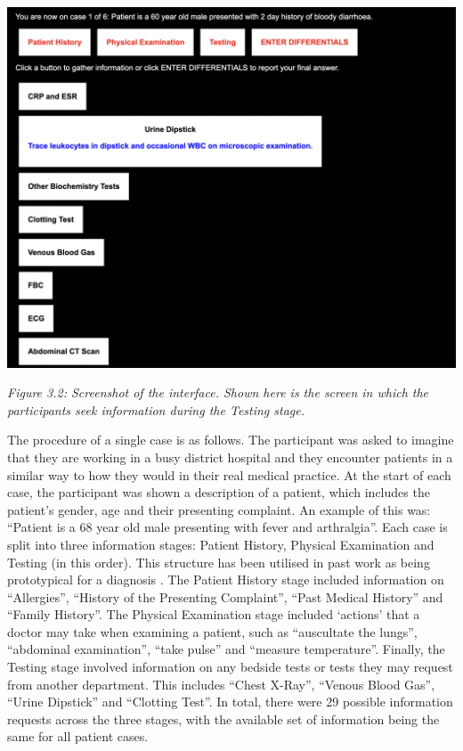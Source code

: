 \documentclass[a4paper, nobind]{templates/ociamthesis}
\begin{document}
\begin{center}\includegraphics[width=1\linewidth]{./assets/Screenshot1} \end{center}

\emph{Figure 3.2: Screenshot of the interface. Shown here is the screen in which the participants seek information during the Testing stage.}

The procedure of a single case is as follows. The participant was asked to imagine that they are working in a busy district hospital and they encounter patients in a similar way to how they would in their real medical practice. At the start of each case, the participant was shown a description of a patient, which includes the patient's gender, age and their presenting complaint. An example of this was: ``Patient is a 68 year old male presenting with fever and arthralgia''. Each case is split into three information stages: Patient History, Physical Examination and Testing (in this order). This structure has been utilised in past work as being prototypical for a diagnosis \autocite{hampton_relative_1975,peterson_contributions_1992}. The Patient History stage included information on ``Allergies'', ``History of the Presenting Complaint'', ``Past Medical History'' and ``Family History''. The Physical Examination stage included `actions' that a doctor may take when examining a patient, such as ``auscultate the lungs'', ``abdominal examination'', ``take pulse'' and ``measure temperature''. Finally, the Testing stage involved information on any bedside tests or tests they may request from another department. This includes ``Chest X-Ray'', ``Venous Blood Gas'', ``Urine Dipstick'' and ``Clotting Test''. In total, there were 29 possible information requests across the three stages, with the available set of information being the same for all patient cases.\\
\end{document}
